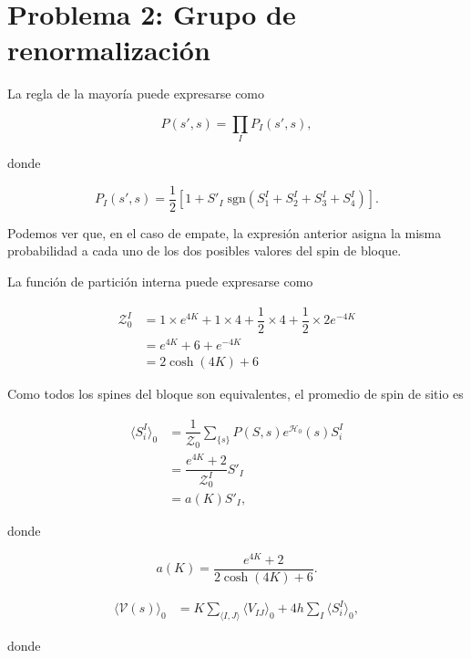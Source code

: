 \documentclass[10pt]{article}
\begin{document}
\section*{Problema 2: Grupo de renormalizaci\'on}

La regla de la mayor\'ia puede expresarse como

\begin{equation}
P(s', s) = \prod_I P_I(s',s),
\end{equation}

donde 

\begin{equation}
P_I(s', s) = \dfrac{1}{2} \left[ 1 + S'_I\; \mathrm{sgn}(S_1^I+S_2^I+S_3^I+S_4^I) \right].
\end{equation}

Podemos ver que, en el caso de empate, la expresi\'on anterior asigna la misma probabilidad a cada uno de los dos posibles valores del spin de bloque.

La funci\'on de partici\'on interna puede expresarse como

\begin{align}
\mathcal{Z}_0^I &= 1\times e^{4K} + 1\times 4 + \dfrac{1}{2}\times 4 + \dfrac{1}{2}\times 2e^{-4K} \nonumber \\
&= e^{4K} + 6 + e^{-4K} \nonumber \\
&= 2 \cosh(4K) + 6
\end{align}

Como todos los spines del bloque son equivalentes, el promedio de spin de sitio es 

\begin{align}
\langle S_i^I \rangle_0 &= \dfrac{1}{\mathcal{Z}_0} \sum_{\lbrace s \rbrace} P(S, s) e^{\mathcal{H}_0}(s) S_i^I \nonumber \\
 &= \dfrac{e^{4K} + 2}{\mathcal{Z}_0^I} S'_I\nonumber \\
&= a(K) S'_I,
\end{align}

donde

\begin{equation}
a(K) =   \dfrac{e^{4K} + 2}{2 \cosh(4K) + 6}.
\end{equation}

\begin{align}
\langle \mathcal{V}(s)\rangle_0 &= K\sum_{\langle I,J\rangle} \langle V_{IJ} \rangle_0 + 4 h \sum_I \langle S_i^I \rangle_0,
\end{align}

donde 
\end{document}
